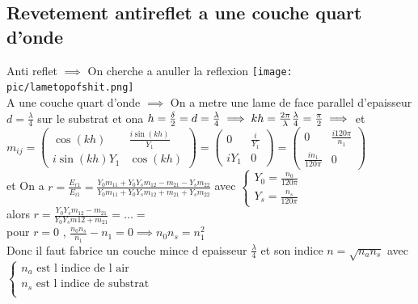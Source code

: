 \documentclass[12pt]{book}
\begin{document}
            \subsection{Revetement antireflet a une couche quart d'onde}
                Anti reflet $\implies$ On cherche a anuller la reflexion  \texttt{[image: pic/lametopofshit.png]}\\
                A une couche quart d'onde $\implies$ On a metre une lame de face parallel d'epaisseur $d=\frac{\lambda}{4}$ sur le substrat et ona $h=\frac{\delta}{2}=d=\frac{\lambda}{4} \implies kh=\frac{2\pi}{\lambda}\frac{\lambda}{4}=\frac{\pi}{2} \\ \implies$ et   \\
                $m_{ij} =
                \begin{pmatrix}
                    \cos(kh) & \frac{i\sin(kh)}{Y_1} \\
                    i\sin(kh)Y_1 & \cos(kh) 
                \end{pmatrix} =
                \begin{pmatrix}
                    0 & \frac{i}{Y_1} \\
                    iY_1 & 0
                \end{pmatrix} =
                \begin{pmatrix}
                    0 & \frac{i120\pi}{n_1} \\
                    \frac{in_1}{120\pi} & 0
                \end{pmatrix}$ \\
                et On a $r=\frac{E_{r1}}{E_{i1}} = \frac{Y_0m_{11}+Y_0Y_sm_{12}-m_{21}-Y_sm_{22}}{Y_0m_{11}+Y_0Y_sm_{12}+m_{21}+Y_sm_{22}} $ avec $\begin{cases} Y_0 = \frac{n_0}{120\pi} \\ Y_s = \frac{n_s}{120\pi}\end{cases} $ \\ 
                alors  $r = \frac{Y_0Y_sm_{12}-m_{21}}{Y_0Y_sm{12}+m_{21}} =\ldots = $\\
                pour $r = 0 $ , $\frac{n_0n_s}{n_1}-n_1 = 0 \implies n_0n_s=n_1^2$\\
                Donc il faut fabrice un couche mince d epaisseur $\frac{\lambda}{4}$ et son indice $n=\sqrt{n_{a}n_{s}}$ avec $\begin{cases}
                    n_a \text{ est l indice de l air}\\
                    n_s \text{ est l indice de substrat}\\
                \end{cases}$
\end{document}
